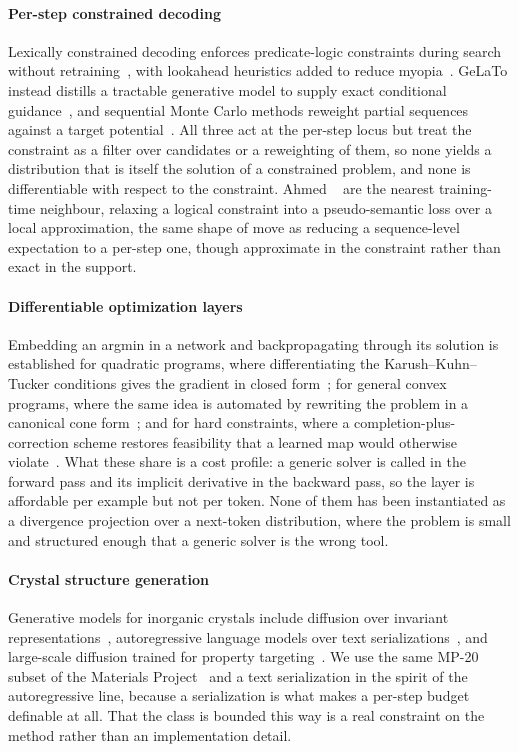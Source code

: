 \paragraph{Per-step constrained decoding}
Lexically constrained decoding enforces predicate-logic constraints during search
without retraining~\citep{lu2021neurologic}, with lookahead heuristics added to reduce
myopia~\citep{lu2022neurologic}. GeLaTo instead distills a tractable generative model to
supply exact conditional guidance~\citep{zhang2023gelato}, and sequential Monte Carlo
methods reweight partial sequences against a target
potential~\citep{zhao2024twisted, loula2025syntactic}. All three act at the per-step locus but treat the
constraint as a filter over candidates or a reweighting of them, so none yields a
distribution that is itself the solution of a constrained problem, and none is
differentiable with respect to the constraint. Ahmed
\etal~\citep{ahmed2023pseudosemantic} are the nearest training-time neighbour, relaxing
a logical constraint into a pseudo-semantic loss over a local approximation, the
same shape of move as reducing a sequence-level expectation to a per-step one, though
approximate in the constraint rather than exact in the support.

\paragraph{Differentiable optimization layers}
Embedding an argmin in a network and backpropagating through its solution is established
for quadratic programs, where differentiating the Karush--Kuhn--Tucker conditions gives the
gradient in closed form~\citep{amos2017optnet}; for general convex programs, where the same
idea is automated by rewriting the problem in a canonical cone
form~\citep{agrawal2019cvxpylayers}; and for hard constraints, where a completion-plus-
correction scheme restores feasibility that a learned map would otherwise
violate~\citep{donti2021dc3}. What these share is a cost profile: a generic solver is
called in the forward pass and its implicit derivative in the backward pass, so the layer
is affordable per example but not per token. None of them has been instantiated as a
divergence projection over a next-token distribution, where the problem is small and
structured enough that a generic solver is the wrong tool.

\paragraph{Crystal structure generation}
Generative models for inorganic crystals include diffusion over invariant
representations~\citep{xie2022cdvae, jiao2023diffcsp}, autoregressive language
models over text serializations~\citep{antunes2024crystallm, gruver2024finetuned}, and
large-scale diffusion trained for property targeting~\citep{zeni2025mattergen}. We use
the same MP-20 subset of the Materials Project~\citep{jain2013materialsproject} and a
text serialization in the spirit of the autoregressive line, because a serialization is
what makes a per-step budget definable at all. That the class is bounded this way is a real
constraint on the method rather than an implementation detail.

